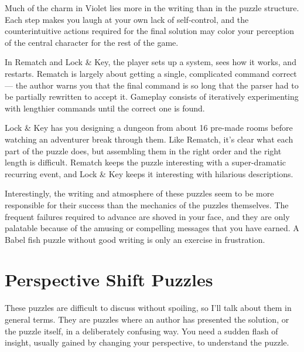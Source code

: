 Much of the charm in Violet lies more in the writing than in the puzzle structure. Each step makes you laugh at your own lack of self-control, and the counterintuitive actions required for the final solution may color your perception of the central character for the rest of the game.

In Rematch and Lock \& Key, the player sets up a system, sees how it works, and restarts. Rematch is largely about getting a single, complicated command correct — the author warns you that the final command is so long that the parser had to be partially rewritten to accept it. Gameplay consists of iteratively experimenting with lengthier commands until the correct one is found. 

Lock \& Key has you designing a dungeon from about 16 pre-made rooms before watching an adventurer break through them. Like Rematch, it’s clear what each part of the puzzle does, but assembling them in the right order and the right length is difficult. Rematch keeps the puzzle interesting with a super-dramatic recurring event, and Lock \& Key keeps it interesting with hilarious descriptions.

Interestingly, the writing and atmosphere of these puzzles seem to be more responsible for their success than the mechanics of the puzzles themselves. The frequent failures required to advance are shoved in your face, and they are only palatable because of the amusing or compelling messages that you have earned. A Babel fish puzzle without good writing is only an exercise in frustration.

\section{Perspective Shift Puzzles}

These puzzles are difficult to discuss without spoiling, so I’ll talk about them in general terms. They are puzzles where an author has presented the solution, or the puzzle itself, in a deliberately confusing way. You need a sudden flash of insight, usually gained by changing your perspective, to understand the puzzle.

